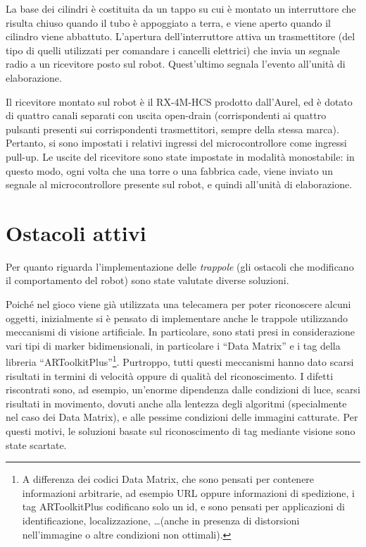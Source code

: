 La base dei cilindri è costituita da un tappo su cui è montato un interruttore che risulta chiuso quando il tubo è appoggiato a terra, e viene aperto quando il cilindro viene abbattuto. L'apertura dell'interruttore attiva un trasmettitore (del tipo di quelli utilizzati per comandare i cancelli elettrici) che invia un segnale radio a un ricevitore posto sul robot. Quest'ultimo segnala l'evento all'unità di elaborazione.

Il ricevitore montato sul robot è il RX-4M-HCS prodotto dall'Aurel, ed è dotato di quattro canali separati con uscita open-drain (corrispondenti ai quattro pulsanti presenti sui corrispondenti trasmettitori, sempre della stessa marca). Pertanto, si sono impostati i relativi ingressi del microcontrollore come ingressi pull-up. Le uscite del ricevitore sono state impostate in modalità monostabile: in questo modo, ogni volta che una torre o una fabbrica cade, viene inviato un segnale al microcontrollore presente sul robot, e quindi all'unità di elaborazione.

\section{Ostacoli attivi}
Per quanto riguarda l'implementazione delle \emph{trappole} (gli ostacoli che modificano il comportamento del robot) sono state valutate diverse soluzioni.

Poiché nel gioco viene già utilizzata una telecamera per poter riconoscere alcuni oggetti, inizialmente si è pensato di implementare anche le trappole utilizzando meccanismi di visione artificiale. In particolare, sono stati presi in considerazione vari tipi di marker bidimensionali, in particolare i ``Data Matrix'' e i tag della libreria ``ARToolkitPlus''\footnote{A differenza dei codici Data Matrix, che sono pensati per contenere informazioni arbitrarie, ad esempio URL oppure informazioni di spedizione, i tag ARToolkitPlus codificano solo un id, e sono pensati per applicazioni di identificazione, localizzazione, \dots (anche in presenza di distorsioni nell'immagine o altre condizioni non ottimali).}. Purtroppo, tutti questi meccanismi hanno dato scarsi risultati in termini di velocità oppure di qualità del riconoscimento. I difetti riscontrati sono, ad esempio, un'enorme dipendenza dalle condizioni di luce, scarsi risultati in movimento, dovuti anche alla lentezza degli algoritmi (specialmente nel caso dei Data Matrix), e alle pessime condizioni delle immagini catturate. Per questi motivi, le soluzioni basate sul riconoscimento di tag mediante visione sono state scartate.


